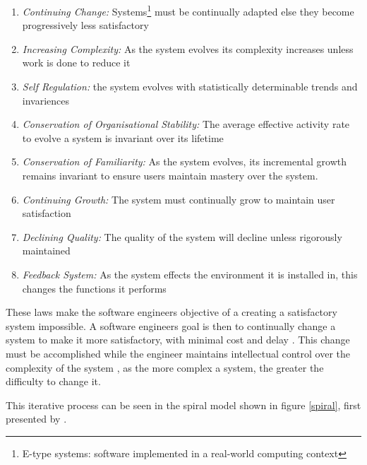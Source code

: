 \begin{enumerate}
  \item \textit{Continuing Change:} Systems\footnote{E-type systems: software implemented in a real-world computing context} must be continually adapted else they become progressively less satisfactory
  \item \textit{Increasing Complexity:} As the system evolves its complexity increases unless work is done to reduce it
  \item \textit{Self Regulation:} the system evolves with statistically determinable trends and invariences
  \item \textit{Conservation of Organisational Stability:} The average effective activity rate to evolve a system is invariant over its lifetime
  \item \textit{Conservation of Familiarity:} As the system evolves, its incremental growth remains invariant to ensure users maintain mastery over the system.
  \item \textit{Continuing Growth:} The system must continually grow to maintain user satisfaction
  \item \textit{Declining Quality:} The quality of the system will decline unless rigorously maintained
  \item \textit{Feedback System:} As the system effects the environment it is installed in, this changes the functions it performs
\end{enumerate}

These laws make the software engineers objective of a creating a satisfactory system impossible.
A software engineers goal is then to continually change a system to make it more satisfactory, with minimal cost and delay \cite{Lehman2006}.
This change must be accomplished while the engineer maintains intellectual control over the complexity of the system \cite{Brooks1975}, 
as the more complex a system, the greater the difficulty to change it.

This iterative process can be seen in the spiral model shown in figure \ref{spiral}, first presented by \cite{Boehm1988}.

